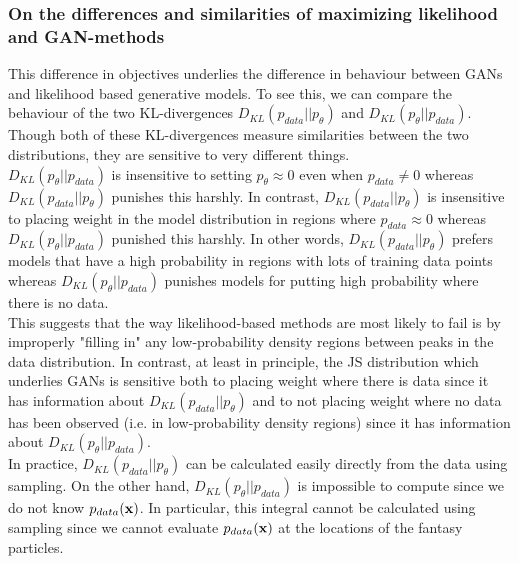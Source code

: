 \subsubsection{On the differences and similarities of maximizing likelihood and GAN-methods}
This difference in objectives underlies the difference in behaviour between GANs and likelihood based generative models. To see this, we can compare the behaviour of the two KL-divergences $D_{KL}(p_{data}||p_\theta)$ and $D_{KL}(p_\theta ||p_{data})$. Though both of these KL-divergences measure similarities between the two distributions, they are sensitive to very different things.
\\
$D_{KL}(p_\theta ||p_{data})$ is insensitive to setting $p_\theta \approx 0$ even when $p_{data}\neq 0$ whereas $D_{KL}(p_{data}||p_\theta)$ punishes this harshly. In contrast, $D_{KL}(p_{data}||p_\theta)$ is insensitive to placing weight in the model distribution in regions where $p_{data}\approx 0$ whereas $D_{KL}(p_\theta||p_{data})$ punished this harshly. In other words, $D_{KL}(p_{data}||p_\theta)$ prefers models that have a high probability in regions with lots of training data points whereas $D_{KL}(p_\theta || p_{data})$ punishes models for putting high probability where there is no data.\\
This suggests that the way likelihood-based methods are most likely to fail is by improperly "filling in" any low-probability density regions between peaks in the data distribution. In contrast, at least in principle, the JS distribution which underlies GANs is sensitive both to placing weight where there is data since it has information about $D_{KL}(p_{data}||p_\theta)$ and to not placing weight where no data has been observed (i.e. in low-probability density regions) since it has information about $D_{KL}(p_\theta||p_{data})$.\\
In practice, $D_{KL}(p_{data}||p_\theta)$ can be calculated easily directly from the data using sampling. On the other hand, $D_{KL}(p_\theta ||p_{data})$ is impossible to compute since we do not know $p_{data}(\mathbf{x})$. In particular, this integral cannot be calculated using sampling since we cannot evaluate $p_{data}(\mathbf{x})$ at the locations of the fantasy particles. 
